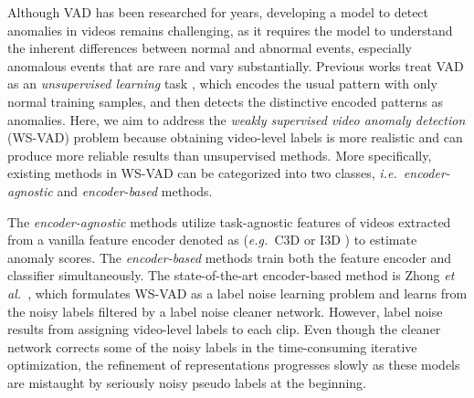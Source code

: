 \documentclass[final]{cvpr}
\newcommand{\ftst}{\textcolor[rgb]{0,0, 0}}
\newcommand{\jcst}{\textcolor[rgb]{0,0,0}}
\newcommand{\jcnd}{\textcolor[rgb]{0,0.,0}}
\newcommand{\jcgam}{\textcolor[rgb]{0.,0.,0}}
\newcommand{\jcca}{\textcolor[rgb]{0,0,0}}
\renewcommand{\eg}{\textit{e.g.\ }}
\renewcommand{\ie}{\textit{i.e.\ }}
\newcommand{\et}{\textit{et al.\ }}
\begin{document}
\jcst{Although VAD has been researched for years,}
developing a model to detect anomalies in videos remains challenging, as it requires the model to understand the inherent differences between normal and abnormal events, especially anomalous events that are rare and vary substantially.
Previous works treat VAD as an \textit{unsupervised learning} task \cite{zhao2011online,lu2013abnormal,hasan2016learning,luo2017revisit,liu2018future,gong2019memorizing,zhou2019anomalynet} \jcst{, which 
\jcgam{ encodes the usual pattern with only normal training samples, and then detects the distinctive encoded patterns as anomalies.}}
Here, we aim to address the \textit{weakly supervised video anomaly detection} (WS-VAD) problem \cite{sultani2018real,zhong2019graph,zhang2019temporal,zhu2019motion,wan2020weakly} \ftst{because obtaining video-level labels is more realistic and can produce more reliable results than unsupervised methods.}
More specifically, existing methods in WS-VAD can be categorized into two classes,
\ie \textit{encoder-agnostic} and \textit{encoder-based} methods.

\jcst{The \textit{encoder-agnostic} methods \jcca{\cite{sultani2018real,zhang2019temporal,wan2020weakly}} utilize task-agnostic features of videos extracted from a vanilla feature encoder denoted as  (\eg C3D \cite{tran2015learning} or I3D \cite{carreira2017quo}) to estimate anomaly scores.
The \textit{encoder-based} methods \jcca{\cite{zhu2019motion,zhong2019graph}} train both the feature encoder and classifier simultaneously.}
\jcnd{The state-of-the-art encoder-based method is
Zhong \et  \cite{zhong2019graph}, which} formulates WS-VAD as a label noise learning problem 
\jcnd{and learns from the noisy labels filtered by a label noise cleaner network.}
However, label noise results from assigning video-level labels to each clip. Even though the cleaner network corrects some of the noisy labels \jcst{in the time-consuming iterative optimization},
\jcst{the refinement of representations progresses slowly }
as \ftst{these models are \jcgam{mistaught} by \jcst{seriously noisy pseudo labels}
at the beginning.}

 
\end{document}

